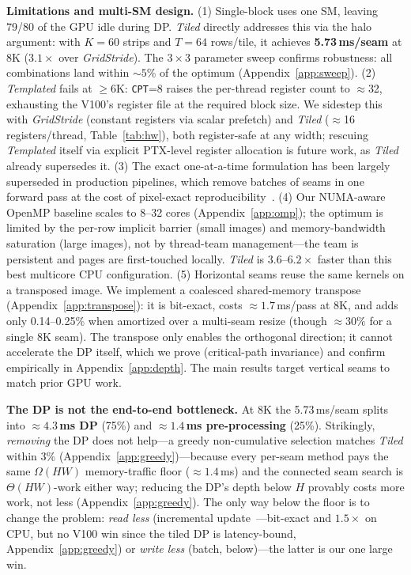 \textbf{Limitations and multi-SM design.} (1) Single-block uses one SM, leaving
79/80 of the GPU idle during DP. \emph{Tiled} directly addresses this via the
halo argument: with $K{=}60$ strips and $T{=}64$ rows/tile, it achieves
\textbf{5.73\,ms/seam} at 8K (\textbf{$3.1\times$} over \emph{GridStride}). The
$3\times3$ parameter sweep confirms robustness: all combinations land within
${\sim}5\%$ of the optimum (Appendix~\ref{app:sweep}).
(2) \emph{Templated} fails at ${\ge}6$K: \texttt{CPT}=8 raises the per-thread
register count to ${\approx}$32, exhausting the V100's register file
at the required block size. We sidestep this with \emph{GridStride} (constant
registers via scalar prefetch) and \emph{Tiled} (${\approx}$16 registers/thread,
Table~\ref{tab:hw}), both register-safe at any width; rescuing \emph{Templated}
itself via explicit PTX-level register allocation is future work, as \emph{Tiled}
already supersedes it.
(3) The exact one-at-a-time formulation has been largely superseded in
production pipelines, which remove batches of seams in one forward pass at
the cost of pixel-exact reproducibility~\cite{kim2015}.
(4) Our NUMA-aware OpenMP baseline scales to 8--32 cores (Appendix~\ref{app:omp});
the optimum is limited by the per-row implicit barrier (small images) and
memory-bandwidth saturation (large images), not by thread-team management---the
team is persistent and pages are first-touched locally. \emph{Tiled} is
$3.6$--$6.2\times$ faster than this best multicore CPU configuration.
(5) Horizontal seams reuse the same kernels on a transposed image. We implement
a coalesced shared-memory transpose (Appendix~\ref{app:transpose}): it is
bit-exact, costs ${\approx}1.7$\,ms/pass at 8K, and adds only 0.14--0.25\%
when amortized over a multi-seam resize (though ${\approx}30\%$ for a single 8K
seam). The transpose only enables the orthogonal direction; it cannot
accelerate the DP itself, which we prove (critical-path invariance) and confirm
empirically in Appendix~\ref{app:depth}. The main results target vertical seams
to match prior GPU work.

\textbf{The DP is not the end-to-end bottleneck.}
At 8K the 5.73\,ms/seam splits into \textbf{${\approx}4.3$\,ms DP} (75\%) and
\textbf{${\approx}1.4$\,ms pre-processing} (25\%). Strikingly, \emph{removing}
the DP does not help---a greedy non-cumulative selection matches \emph{Tiled}
within 3\% (Appendix~\ref{app:greedy})---because every per-seam method pays the
same $\Omega(HW)$ memory-traffic floor (${\approx}1.4$\,ms) and the connected
seam search is $\Theta(HW)$-work either way; reducing the DP's depth below $H$
provably costs more work, not less (Appendix~\ref{app:greedy}). The only way
below the floor is to change the problem: \emph{read less} (incremental
update~\cite{lee2009}---bit-exact and $1.5\times$ on CPU, but no V100 win since
the tiled DP is latency-bound, Appendix~\ref{app:greedy}) or \emph{write less}
(batch, below)---the latter is our one large win.

